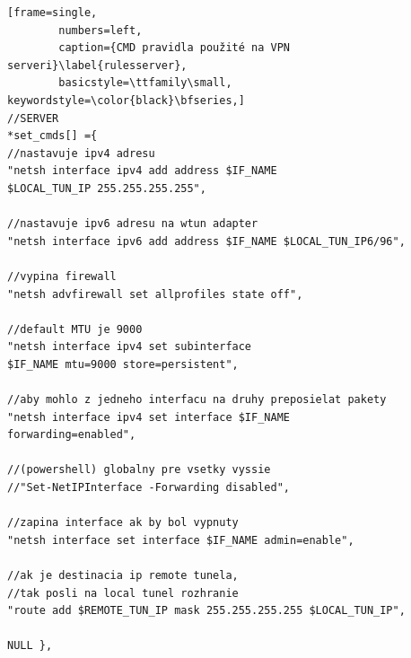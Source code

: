 \begin{minipage}{\linewidth} 	
	\begin{lstlisting}[frame=single,
		numbers=left,
		caption={CMD pravidla použité na VPN serveri}\label{rulesserver},
		basicstyle=\ttfamily\small, keywordstyle=\color{black}\bfseries,]
//SERVER
*set_cmds[] ={
//nastavuje ipv4 adresu
"netsh interface ipv4 add address $IF_NAME 
$LOCAL_TUN_IP 255.255.255.255", 
	
//nastavuje ipv6 adresu na wtun adapter   
"netsh interface ipv6 add address $IF_NAME $LOCAL_TUN_IP6/96", 
	      
//vypina firewall 
"netsh advfirewall set allprofiles state off", 
	
//default MTU je 9000                    
"netsh interface ipv4 set subinterface 
$IF_NAME mtu=9000 store=persistent",
	 
//aby mohlo z jedneho interfacu na druhy preposielat pakety 
"netsh interface ipv4 set interface $IF_NAME 
forwarding=enabled",
	
//(powershell) globalny pre vsetky vyssie 
//"Set-NetIPInterface -Forwarding disabled", 
	
//zapina interface ak by bol vypnuty
"netsh interface set interface $IF_NAME admin=enable",  
	
//ak je destinacia ip remote tunela, 
//tak posli na local tunel rozhranie    
"route add $REMOTE_TUN_IP mask 255.255.255.255 $LOCAL_TUN_IP", 
	   
NULL },
	\end{lstlisting}
\end{minipage}\\ 

